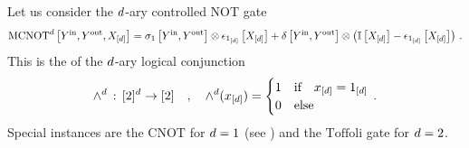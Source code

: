 \begin{example}\label{exa:mcnotBenc}
    Let us consider the $d$-ary controlled $\mathrm{NOT}$ gate
    \begin{align*}
        \mathrm{MCNOT}^{d}\left[Y^{\mathrm{in}},Y^{\mathrm{out}},X_{[d]}\right]
        = \sigma_1\left[Y^{\mathrm{in}},Y^{\mathrm{out}}\right] \otimes \epsilon_{1_{[d]}}\left[X_{[d]}\right]
        + \delta\left[Y^{\mathrm{in}},Y^{\mathrm{out}}\right] \otimes \left(\mathbb{I}\left[X_{[d]}\right]-\epsilon_{1_{[d]}}\left[X_{[d]}\right]\right) \, .
    \end{align*}
    This is the \computationCircuit{} of the $d$-ary logical conjunction
    \begin{align*}
        \land^{d} \,:\, [2]^{d} \rightarrow [2]
        \quad , \quad
         \land^{d}(x_{[d]})
        = \begin{cases}
              1 & \text{if}\quad x_{[d]} = 1_{[d]} \\
              0 & \text{else}
        \end{cases} \, .
    \end{align*}
    Special instances are the $\mathrm{CNOT}$ for $d=1$ (see ) and the $\mathrm{Toffoli}$ gate for $d=2$.
\end{example}